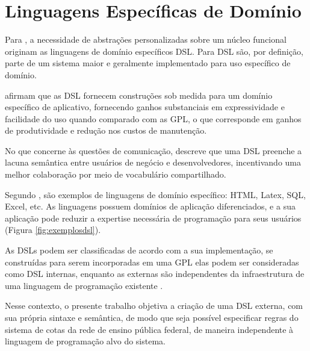 \section{Linguagens Específicas de Domínio}
\label{sec:dsl}

Para , a necessidade de abstrações personalizadas sobre um núcleo funcional originam as linguagens de domínio específicos \gls{DSL}. Para  \gls{DSL} são, por definição, parte de um sistema maior e geralmente implementado para uso específico de domínio.

 afirmam que as \gls{DSL} fornecem construções sob medida para um domínio específico de aplicativo, fornecendo ganhos substanciais em expressividade e facilidade do uso quando comparado com as \gls{GPL}, o que corresponde em ganhos de produtividade e redução nos custos de manutenção.

No que concerne às questões de comunicação,  descreve que uma \gls{DSL} preenche a lacuna semântica entre usuários de negócio e desenvolvedores, incentivando uma melhor colaboração por meio de vocabulário compartilhado.  

Segundo , são exemplos de linguagens de domínio específico: HTML, Latex, SQL, Excel, etc. As linguagens possuem domínios de aplicação diferenciados, e a sua aplicação pode reduzir a expertise necessária de programação para seus usuários (Figura \ref{fig:exemplosdsl}).




As \gls{DSL}s podem ser classificadas de acordo com a sua implementação, se construídas para serem incorporadas em uma \gls{GPL} elas podem ser consideradas como \gls{DSL} internas, enquanto as externas são independentes da infraestrutura de uma linguagem de programação existente \cite{dslengineering}.

Nesse contexto, o presente trabalho objetiva a criação de uma \gls{DSL} externa, com sua própria sintaxe e semântica, de modo que seja possível especificar regras do sistema de cotas da rede de ensino pública federal, de maneira independente à linguagem de programação alvo do sistema. 



